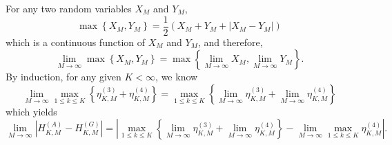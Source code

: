 \documentclass[11pt, draftclsnofoot, onecolumn]{IEEEtran}
\begin{document}
\begin{IEEEproof}
For any two random variables $X_M$ and $Y_M$, 
\begin{equation}
\max \left\{ {{X_M},{Y_M}} \right\} = \frac{1}{2}\left( {{X_M} + {Y_M} + \left| {{X_M} - {Y_M}} \right|} \right)
\end{equation}
which is a continuous function of $X_M$ and $Y_M$, and therefore,
\begin{equation}
\mathop {\lim }\limits_{M \to \infty } \max \left\{ {{X_M},{Y_M}} \right\} = \max \left\{ {\mathop {\lim }\limits_{M \to \infty } {X_M},\mathop {\lim }\limits_{M \to \infty } {Y_M}} \right\}.
\end{equation}
By induction, for any given $K<\infty$, we know
\begin{equation}
\mathop {\lim }\limits_{M \to \infty } \mathop {\max }\limits_{1 \le k \le K} \left\{ {\eta _{K,M}^{(3)} + \eta _{K,M}^{(4)}} \right\} = \mathop {\max }\limits_{1 \le k \le K} \left\{ {\mathop {\lim }\limits_{M \to \infty } \eta _{K,M}^{(3)} + \mathop {\lim }\limits_{M \to \infty } \eta _{K,M}^{(4)}} \right\}
\end{equation}
which yields
\begin{equation} \label{H_limit_diff_2}
\mathop {\lim }\limits_{M \to \infty } \left| {H_{K,M}^{\left( A \right)} -  H_{K,M}^{\left( G \right)}} \right|  =  \left| {\mathop {\max }\limits_{1 \le k \le K} \left\{ {\mathop {\lim }\limits_{M \to \infty } \eta _{K,M}^{(3)} + \mathop {\lim }\limits_{M \to \infty } \eta _{K,M}^{(4)}} \right\} - \mathop {\lim }\limits_{M \to \infty } \mathop {\max }\limits_{1 \le k \le K}  \eta _{K,M}^{(4)}} \right|.
\end{equation}


\end{IEEEproof}
\end{document}
